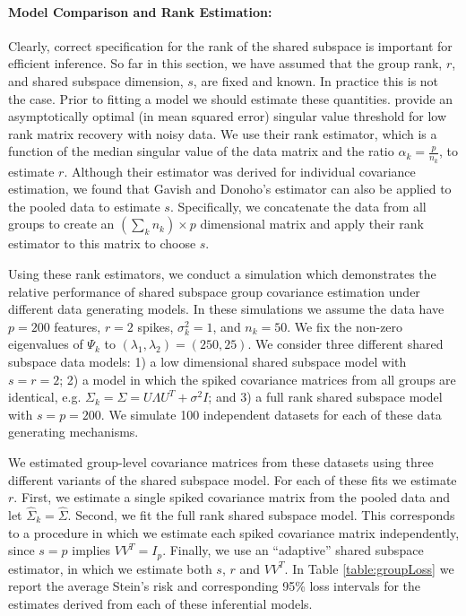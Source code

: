 \documentclass[12pt]{article}
\begin{document}
\paragraph{Model Comparison and Rank Estimation:}

Clearly, correct specification for the rank of the shared subspace is
important for efficient inference.  So far in this section, we have
assumed that the group rank, $r$, and shared subspace dimension, $s$,
are fixed and known.  In practice this is not the case.  Prior to
fitting a model we should estimate these quantities.
\citet{Gavish2014} provide an asymptotically optimal (in mean squared
error) singular value threshold for low rank matrix recovery with
noisy data.  We use their rank estimator, which is a function of the
median singular value of the data matrix and the ratio
$\alpha_k =\frac{p}{n_k}$, to estimate $r$.  Although their estimator
was derived for individual covariance estimation, we found that Gavish
and Donoho's estimator can also be applied to the pooled data to
estimate $s$.  Specifically, we concatenate the data from all groups
to create an $(\sum_k n_k) \times p$ dimensional matrix and apply
their rank estimator to this matrix to choose $s$.

Using these rank estimators, we conduct a simulation which
demonstrates the relative performance of shared subspace group
covariance estimation under different data generating models.  In
these simulations we assume the data have $p=200$ features, $r=2$
spikes, $\sigma^2_k=1$, and $n_k = 50$.  We fix the non-zero eigenvalues of
$\Psi_k$ to $(\lambda_1, \lambda_2) = (250, 25)$.  We consider three
different shared subspace data models: 1) a low dimensional shared
subspace model with $s=r=2$; 2) a model in which the spiked covariance
matrices from all groups are identical, e.g.
$\Sigma_k = \Sigma = U\Lambda U^T + \sigma^2I$; and 3) a full rank
shared subspace model with $s=p=200$.  We simulate 100 independent
datasets for each of these data generating mechanisms.

We estimated group-level covariance matrices from these datasets using three different variants of the shared
subspace model.  For each of these fits we estimate $r$.  First, we
estimate a single spiked covariance matrix from the pooled data and
let $\hat{\Sigma}_k = \hat{\Sigma}$.  Second, we fit the full rank
shared subspace model.  This corresponds to a procedure in which we
estimate each spiked covariance matrix independently, since $s=p$
implies $VV^T = I_p$.  Finally, we use an ``adaptive'' shared subspace
estimator, in which we estimate both $s$, $r$ and $VV^T$.  In Table
\ref{table:groupLoss} we report the average Stein's risk and
corresponding 95\% loss intervals for the estimates derived from each
of these inferential models.
\end{document}
